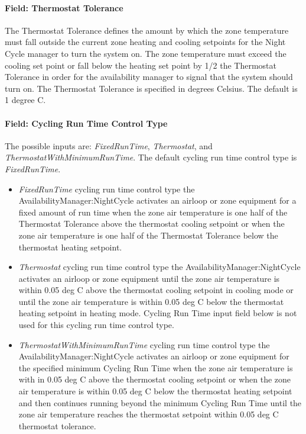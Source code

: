 \paragraph{Field: Thermostat Tolerance}\label{field-thermostat-tolerance}

The Thermostat Tolerance defines the amount by which the zone temperature must fall outside the current zone heating and cooling setpoints for the Night Cycle manager to turn the system on. The zone temperature must exceed the cooling set point or fall below the heating set point by 1/2 the Thermostat Tolerance in order for the availability manager to signal that the system should turn on. The Thermostat Tolerance is specified in degrees Celsius. The default is 1 degree C.

\paragraph{Field: Cycling Run Time Control Type}\label{field-cycling-run-time-control-type}

The possible inputs are: \emph{FixedRunTime}, \emph{Thermostat}, and \emph{ThermostatWithMinimumRunTime}. The default cycling run time control type is \emph{FixedRunTime}.

\begin{itemize}
\tightlist
\item  \emph{FixedRunTime} cycling run time control type the AvailabilityManager:NightCycle activates an airloop or zone equipment for a fixed amount of run time when the zone air temperature is one half of the Thermostat Tolerance above the thermostat cooling setpoint or when the zone air temperature is one half of the Thermostat Tolerance below the thermostat heating setpoint.
\item  \emph{Thermostat} cycling run time control type the AvailabilityManager:NightCycle activates an airloop or zone equipment until the zone air temperature is within 0.05 deg C above the thermostat cooling setpoint in cooling mode or until the zone air temperature is within 0.05 deg C below the thermostat heating setpoint in heating mode. Cycling Run Time input field below is not used for this cycling run time control type.
\item  \emph{ThermostatWithMinimumRunTime} cycling run time control type the AvailabilityManager:NightCycle activates an airloop or zone equipment for the specified minimum Cycling Run Time when the zone air temperature is with in 0.05 deg C above the thermostat cooling setpoint or when the zone air temperature is within 0.05 deg C below the thermostat heating setpoint and then continues running beyond the minimum Cycling Run Time until the zone air temperature reaches the thermostat setpoint within 0.05 deg C thermostat tolerance.
\end{itemize}

